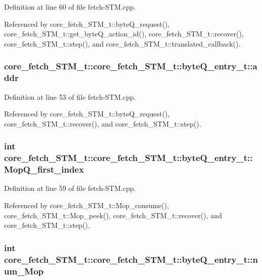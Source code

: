 Definition at line 60 of file fetch-STM.cpp.

Referenced by core\_\-fetch\_\-STM\_\-t::byteQ\_\-request(), core\_\-fetch\_\-STM\_\-t::get\_\-byteQ\_\-action\_\-id(), core\_\-fetch\_\-STM\_\-t::recover(), core\_\-fetch\_\-STM\_\-t::step(), and core\_\-fetch\_\-STM\_\-t::translated\_\-callback().
\subsubsection[{addr}]{ core\_\-fetch\_\-STM\_\-t::core\_\-fetch\_\-STM\_\-t::byteQ\_\-entry\_\-t::addr}\label{structcore__fetch__STM__t_1_1byteQ__entry__t_617d4d4a12ec2109f2d02a9625612fea}




Definition at line 53 of file fetch-STM.cpp.

Referenced by core\_\-fetch\_\-STM\_\-t::byteQ\_\-request(), core\_\-fetch\_\-STM\_\-t::recover(), and core\_\-fetch\_\-STM\_\-t::step().
\subsubsection[{MopQ\_\-first\_\-index}]{\setlength{\rightskip}{0pt plus 5cm}int core\_\-fetch\_\-STM\_\-t::core\_\-fetch\_\-STM\_\-t::byteQ\_\-entry\_\-t::MopQ\_\-first\_\-index}\label{structcore__fetch__STM__t_1_1byteQ__entry__t_76b5a5e471726ebd12382e3c4395bfed}




Definition at line 59 of file fetch-STM.cpp.

Referenced by core\_\-fetch\_\-STM\_\-t::Mop\_\-consume(), core\_\-fetch\_\-STM\_\-t::Mop\_\-peek(), core\_\-fetch\_\-STM\_\-t::recover(), and core\_\-fetch\_\-STM\_\-t::step().
\subsubsection[{num\_\-Mop}]{\setlength{\rightskip}{0pt plus 5cm}int core\_\-fetch\_\-STM\_\-t::core\_\-fetch\_\-STM\_\-t::byteQ\_\-entry\_\-t::num\_\-Mop}\label{structcore__fetch__STM__t_1_1byteQ__entry__t_2ced6cc21377e0a69b55428ce1a3c72c}




